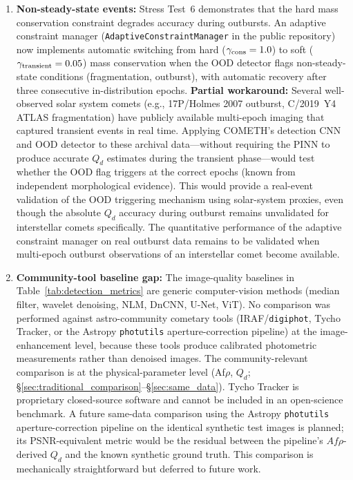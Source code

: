 \documentclass[usenatbib]{mnras}
\begin{document}
\begin{enumerate}
    \item \textbf{Non-steady-state events:} Stress Test~6 demonstrates that the hard mass conservation constraint degrades accuracy during outbursts. An adaptive constraint manager (\texttt{AdaptiveConstraintManager} in the public repository) now implements automatic switching from hard ($\gamma_{\rm cons}=1.0$) to soft ($\gamma_{\rm transient}=0.05$) mass conservation when the OOD detector flags non-steady-state conditions (fragmentation, outburst), with automatic recovery after three consecutive in-distribution epochs. \textbf{Partial workaround:} Several well-observed solar system comets (e.g., 17P/Holmes 2007 outburst, C/2019~Y4 ATLAS fragmentation) have publicly available multi-epoch imaging that captured transient events in real time. Applying COMETH's detection CNN and OOD detector to these archival data---without requiring the PINN to produce accurate $Q_d$ estimates during the transient phase---would test whether the OOD flag triggers at the correct epochs (known from independent morphological evidence). This would provide a real-event validation of the OOD triggering mechanism using solar-system proxies, even though the absolute $Q_d$ accuracy during outburst remains unvalidated for interstellar comets specifically. The quantitative performance of the adaptive constraint manager on real outburst data remains to be validated when multi-epoch outburst observations of an interstellar comet become available.
    \item \textbf{Community-tool baseline gap:} The image-quality baselines in Table~\ref{tab:detection_metrics} are generic computer-vision methods (median filter, wavelet denoising, NLM, DnCNN, U-Net, ViT). No comparison was performed against astro-community cometary tools (IRAF/\texttt{digiphot}, Tycho Tracker, or the Astropy \texttt{photutils} aperture-correction pipeline) at the image-enhancement level, because these tools produce calibrated photometric measurements rather than denoised images. The community-relevant comparison is at the physical-parameter level (Af$\rho$, $Q_d$; \S\ref{sec:traditional_comparison}--\S\ref{sec:same_data}). Tycho Tracker is proprietary closed-source software and cannot be included in an open-science benchmark. A future same-data comparison using the Astropy \texttt{photutils} aperture-correction pipeline on the identical synthetic test images is planned; its PSNR-equivalent metric would be the residual between the pipeline's $Af\rho$-derived $Q_d$ and the known synthetic ground truth. This comparison is mechanically straightforward but deferred to future work.

\end{enumerate}
\end{document}
